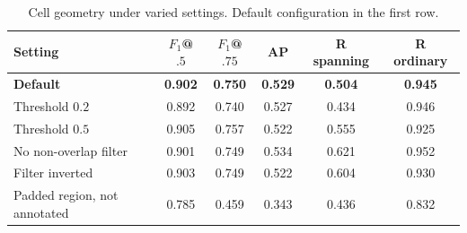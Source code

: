 \begin{table}[H]
\centering
\caption{Cell geometry under varied settings. Default configuration in the first row.}
\label{tab:app-res-cells}
\small
\setlength{\tabcolsep}{5pt}
\begin{tabular}{@{}l c c c c c@{}}
\toprule
Setting & $F_1$@$.5$ & $F_1$@$.75$ & AP & R spanning & R ordinary \\
\midrule
\textbf{Default} & \textbf{0.902} & \textbf{0.750} & \textbf{0.529} & \textbf{0.504} & \textbf{0.945} \\
\midrule
Threshold $0.2$              & 0.892 & 0.740 & 0.527 & 0.434 & 0.946 \\
Threshold $0.5$              & 0.905 & 0.757 & 0.522 & 0.555 & 0.925 \\
\midrule
No non-overlap filter        & 0.901 & 0.749 & 0.534 & 0.621 & 0.952 \\
Filter inverted              & 0.903 & 0.749 & 0.522 & 0.604 & 0.930 \\
\midrule
Padded region, not annotated & 0.785 & 0.459 & 0.343 & 0.436 & 0.832 \\
\bottomrule
\end{tabular}
\end{table}
